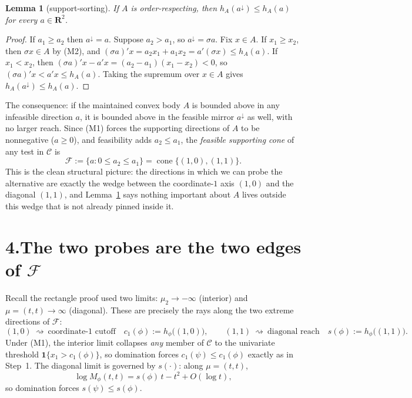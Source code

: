\documentclass[12pt]{article}
\newtheorem{lemma}{Lemma}
\theoremstyle{definition}
\theoremstyle{remark}
\newcommand{\Cclass}{\mathcal C}
\newcommand{\Feas}{\mathcal F}
\newcommand{\sortdown}{{\downarrow}}
\begin{document}
\begin{lemma}[support-sorting]\label{lem:sort}
If $A$ is order-respecting, then $h_A(a^{\sortdown})\le h_A(a)$ for every $a\in\mathbf R^2$.
\end{lemma}

\begin{proof}
If $a_1\ge a_2$ then $a^{\sortdown}=a$. Suppose $a_2>a_1$, so $a^{\sortdown}=\sigma a$. Fix $x\in A$.
If $x_1\ge x_2$, then $\sigma x\in A$ by (M2), and $(\sigma a)'x=a_2x_1+a_1x_2=a'(\sigma x)\le h_A(a)$.
If $x_1<x_2$, then $(\sigma a)'x-a'x=(a_2-a_1)(x_1-x_2)<0$, so $(\sigma a)'x<a'x\le h_A(a)$.
Taking the supremum over $x\in A$ gives $h_A(a^{\sortdown})\le h_A(a)$.
\end{proof}

The consequence: if the maintained convex body $A$ is bounded above in any infeasible direction $a$, it is bounded above in the feasible mirror $a^{\sortdown}$ as well, with no larger reach. Since (M1) forces the supporting directions of $A$ to be nonnegative ($a\ge0$), and feasibility adds $a_2\le a_1$, the \emph{feasible supporting cone} of any test in $\Cclass$ is
\[
\Feas:=\{a:0\le a_2\le a_1\}
=\operatorname{cone}\{(1,0),(1,1)\}.
\]
This is the clean structural picture: the directions in which we can probe the alternative are exactly the wedge between the coordinate-$1$ axis $(1,0)$ and the diagonal $(1,1)$, and Lemma~\ref{lem:sort} says nothing important about $A$ lives outside this wedge that is not already pinned inside it.

\section*{4.\quad The two probes are the two edges of $\Feas$}

Recall the rectangle proof used two limits: $\mu_2\to-\infty$ (interior) and $\mu=(t,t)\to\infty$ (diagonal). These are precisely the rays along the two extreme directions of $\Feas$:
\[
(1,0)\ \rightsquigarrow\ \text{coordinate-1 cutoff}\quad c_1(\phi):=h_\phi\big((1,0)\big),
\qquad
(1,1)\ \rightsquigarrow\ \text{diagonal reach}\quad s(\phi):=h_\phi\big((1,1)\big).
\]
Under (M1), the interior limit collapses \emph{any} member of $\Cclass$ to the univariate threshold $\mathbf 1\{x_1>c_1(\phi)\}$, so domination forces $c_1(\psi)\le c_1(\phi)$ exactly as in Step~1. The diagonal limit is governed by $s(\cdot)$: along $\mu=(t,t)$,
\[
\log M_\phi(t,t)=s(\phi)\,t-t^2+O(\log t),
\]
so domination forces $s(\psi)\le s(\phi)$.
\end{document}

